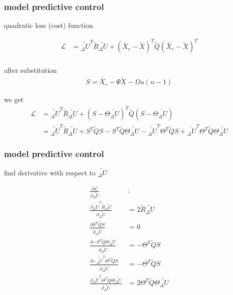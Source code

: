 \documentclass{beamer}
\begin{document}
\begin{frame}
  
  \frametitle{\bf model predictive control}

  quadratic loss (cost) function

  \begin{align*}
    \mathcal{L} &= \tilde{_\Delta U}^T \tilde{R} \tilde{_\Delta U} 
                + (\tilde{X_r} - \tilde{X})^T \tilde{Q} (\tilde{X_r} - \tilde{X})^T \\
  \end{align*}

  after substitution
  \begin{align*}
    S = \tilde{X_r} - \Psi\tilde{X} - \Omega u(n-1)
  \end{align*}

  we get
  \begin{align*}
    \mathcal{L} &= \tilde{_\Delta U}^T \tilde{R} \tilde{_\Delta U} + (S -  \Theta \tilde{_\Delta U} )^T \tilde{Q} (S -  \Theta \tilde{_\Delta U} ) \\
                &= \tilde{_\Delta U}^T \tilde{R} \tilde{_\Delta U} 
                + S^T\tilde{Q}S - S^T \tilde{Q} \Theta \tilde{_\Delta U} 
                - \tilde{_\Delta U}^T \Theta^T\tilde{Q}S + \tilde{_\Delta U}^T\Theta^T\tilde{Q}\Theta\tilde{_\Delta U}
  \end{align*}

\end{frame}



\begin{frame}
  
  \frametitle{\bf model predictive control}

  find derivative with respect to $\tilde{_\Delta U}$ 

  \begin{align*}  
    \frac{\partial \mathcal{L}}{\partial {\tilde{_\Delta U}}} & : \\
    \frac{\partial {\tilde{_\Delta U}^T \tilde{R} \tilde{_\Delta U} } }{\partial {\tilde{_\Delta U}}} & = 2\tilde{R}\tilde{_\Delta U} \\
    \frac{\partial {S^T\tilde{Q}S}}{\partial {\tilde{_\Delta U}}} & = 0 \\
    \frac{\partial {- S^T \tilde{Q} \Theta \tilde{_\Delta U} }}{\partial {\tilde{_\Delta U}}} & = -\Theta^T\tilde{Q}S \\
    \frac{\partial {- \tilde{_\Delta U}^T \Theta^T\tilde{Q}S}}{\partial {\tilde{_\Delta U}}} & = -\Theta^T\tilde{Q}S \\
    \frac{\partial { \tilde{_\Delta U}^T\Theta^T\tilde{Q}\Theta\tilde{_\Delta U}}}{\partial {\tilde{_\Delta U}}} & = 2\Theta^T\tilde{Q}\Theta\tilde{_\Delta U}
  \end{align*}  

\end{frame}
\end{document}
